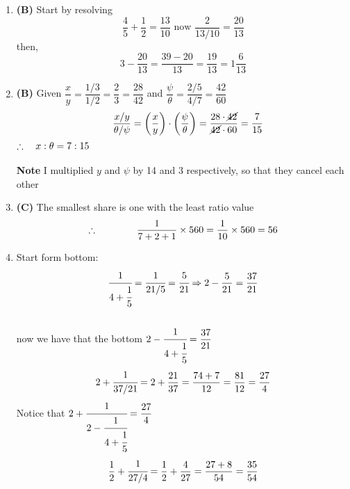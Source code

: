 \begin{multicols}{2}
\begin{enumerate}[label={\arabic*.}]
    \item \textbf{(B)} Start by resolving \\
    \[ \dfrac{4}{5} + \dfrac{1}{2} = \dfrac{13}{10}\text{ now }  \dfrac{2}{13/10} = \dfrac{20}{13} \] 
    then, \\
    \[3 - \dfrac{20}{13} = \dfrac{39 - 20}{13} = \dfrac{19}{13} = 1\dfrac{6}{13} \]
    \item \textbf{(B)} Given $\dfrac{x}{y} = \dfrac{1/3}{1/2} = \dfrac{2}{3} = \dfrac{28}{42}$ and $\dfrac{\psi}{\theta} = \dfrac{2/5}{4/7} = \dfrac{42}{60}$ \\
    \[ \hspace{10px} \dfrac{x/y}{\theta / \psi} = \left(\dfrac{x}{y}\right) \cdot \left(\dfrac{\psi}{\theta}\right) = \dfrac{28 \cdot \cancel{42}}{\cancel{42} \cdot 60} = \dfrac{7}{15}  \]
    \(\therefore \hspace{10px} x:\theta = 7:15\) \\\\
    \textbf{Note} I multiplied $y$ and $\psi$ by 14 and 3 respectively, so that they cancel each other

    \item \textbf{(C)} The smallest share is one with the least ratio value \\
    \[ \therefore \hspace{40px} \dfrac{1}{7+2+1} \times 560 = \dfrac{1}{10} \times 560 = 56\]
    \item Start form bottom: \\
    \[\cfrac{1}{4 + \cfrac{1}{5}}  = \cfrac{1}{ 21/5} = \cfrac{5}{21} \Rightarrow 2 - \dfrac{5}{21} = \dfrac{37}{21}\] \\
    now we have that the bottom \(2 - \cfrac{1}{4 + \cfrac{1}{5}} = \dfrac{37}{21}\) \vspace{3pt}
    \[2 + \cfrac{ 1 }{37/21} = 2 + \dfrac{21}{37}  = \dfrac{74 + 7}{12} = \dfrac{81}{12} = \dfrac{27}{4}\]
    Notice that \(2 + \cfrac{1}{2 - \cfrac{1}{4 + \cfrac{1}{5}}} = \dfrac{27}{4}\) \vspace{3pt}
    \[\dfrac{1}{2} + \cfrac{1}{27/4} = \dfrac{1}{2} + \dfrac{4}{27} = \dfrac{27 + 8}{54} = \dfrac{35}{54} \]


\end{enumerate}
\end{multicols}
